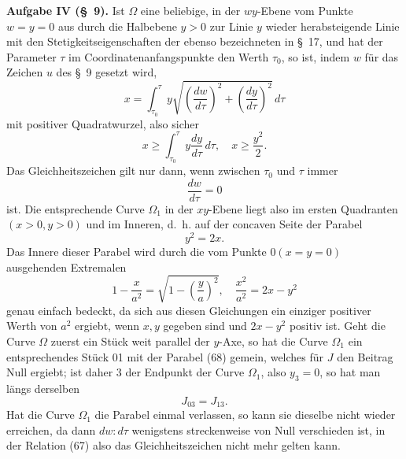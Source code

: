 \documentclass[11pt,a4paper,leqno]{article}
\begin{document}
\noindent\textbf{Aufgabe IV (\S~9).} Ist $\Omega$ eine beliebige, in der $wy$-Ebene vom Punkte $w=y=0$ aus durch die Halbebene $y>0$ zur Linie $y$ wieder herabsteigende Linie mit den Stetigkeitseigenschaften der ebenso bezeichneten in \S~17, und hat der Parameter $\tau$ im Coordinatenanfangspunkte den Werth $\tau_0$, so ist, indem $w$ für das Zeichen $u$ des \S~9 gesetzt wird,
\begin{equation}\tag{66}
x=\int_{\tau_0}^{\tau}
y\sqrt{\left(\frac{dw}{d\tau}\right)^2+\left(\frac{dy}{d\tau}\right)^2}\,d\tau
\end{equation}
mit positiver Quadratwurzel, also sicher
\begin{equation}\tag{67}
x\geq \int_{\tau_0}^{\tau}y\frac{dy}{d\tau}\,d\tau,\quad
x\geq \frac{y^2}{2}.
\end{equation}
Das Gleichheitszeichen gilt nur dann, wenn zwischen $\tau_0$ und $\tau$ immer
\[
\frac{dw}{d\tau}=0
\]
ist. Die entsprechende Curve $\Omega_1$ in der $xy$-Ebene liegt also im ersten Quadranten $(x>0,y>0)$ und im Inneren, d.~h. auf der concaven Seite der Parabel
\begin{equation}\tag{68}
y^2=2x.
\end{equation}
Das Innere dieser Parabel wird durch die vom Punkte $0(x=y=0)$ ausgehenden Extremalen
\begin{equation}\tag{69}
1-\frac{x}{a^2}
=
\sqrt{1-\left(\frac{y}{a}\right)^2},\quad
\frac{x^2}{a^2}=2x-y^2
\end{equation}
genau einfach bedeckt, da sich aus diesen Gleichungen ein einziger positiver Werth von $a^2$ ergiebt, wenn $x,y$ gegeben sind und
$2x-y^2$ positiv ist. Geht die Curve $\Omega$ zuerst ein Stück weit parallel der $y$-Axe, so hat die Curve $\Omega_1$ ein entsprechendes Stück 01 mit der Parabel (68) gemein, welches für $J$ den Beitrag Null ergiebt; ist daher 3 der Endpunkt der Curve $\Omega_1$, also $y_3=0$, so hat man längs derselben
\begin{equation}\tag{70}
J_{03}=J_{13}.
\end{equation}
Hat die Curve $\Omega_1$ die Parabel einmal verlassen, so kann sie dieselbe nicht wieder erreichen, da dann $dw:d\tau$ wenigstens streckenweise von Null verschieden ist, in der Relation (67) also das Gleichheitszeichen nicht mehr gelten kann.
\end{document}
